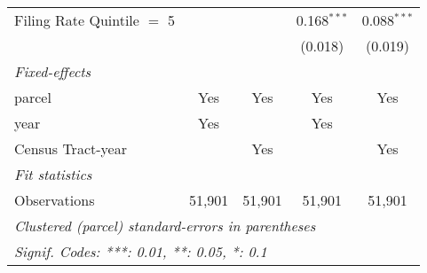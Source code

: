 \begin{table}[htbp]
\begin{tabular}{lcccc}
      Filing Rate Quintile $=$ 5                   &                &                                     & 0.168$^{***}$             & 0.088$^{***}$\\   
                                                   &                &                                     & (0.018)                   & (0.019)\\   
      \midrule
      \emph{Fixed-effects}\\
      parcel                                       & Yes            & Yes                                 & Yes                       & Yes\\  
      year                                         & Yes            &                                     & Yes                       & \\  
      Census Tract-year                            &                & Yes                                 &                           & Yes\\  
      \midrule
      \emph{Fit statistics}\\
      Observations                                 & 51,901         & 51,901                              & 51,901                    & 51,901\\  
      \midrule \midrule
      \multicolumn{5}{l}{\emph{Clustered (parcel) standard-errors in parentheses}}\\
      \multicolumn{5}{l}{\emph{Signif. Codes: ***: 0.01, **: 0.05, *: 0.1}}\\
   \end{tabular}
\end{table}
